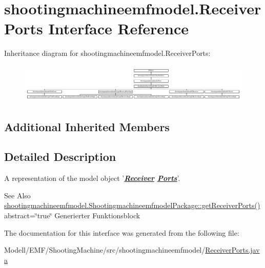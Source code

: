 \hypertarget{interfaceshootingmachineemfmodel_1_1_receiver_ports}{\section{shootingmachineemfmodel.\-Receiver\-Ports Interface Reference}
\label{interfaceshootingmachineemfmodel_1_1_receiver_ports}
}
Inheritance diagram for shootingmachineemfmodel.\-Receiver\-Ports\-:\begin{figure}[H]
\begin{center}
\leavevmode
\includegraphics[height=1.872910cm]{interfaceshootingmachineemfmodel_1_1_receiver_ports}
\end{center}
\end{figure}
\subsection*{Additional Inherited Members}


\subsection{Detailed Description}
A representation of the model object '{\itshape {\bfseries \hyperlink{interfaceshootingmachineemfmodel_1_1_receiver}{Receiver} \hyperlink{interfaceshootingmachineemfmodel_1_1_ports}{Ports}}}'.

\begin{DoxySeeAlso}{See Also}
\hyperlink{interfaceshootingmachineemfmodel_1_1_shootingmachineemfmodel_package_a3814072abeef98ef4b6024cb7797ddec}{shootingmachineemfmodel.\-Shootingmachineemfmodel\-Package\-::get\-Receiver\-Ports()}  abstract=\char`\"{}true\char`\"{} Generierter Funktionsblock 
\end{DoxySeeAlso}


The documentation for this interface was generated from the following file\-:\begin{DoxyCompactItemize}
\item 
Modell/\-E\-M\-F/\-Shooting\-Machine/src/shootingmachineemfmodel/\hyperlink{_receiver_ports_8java}{Receiver\-Ports.\-java}\end{DoxyCompactItemize}
